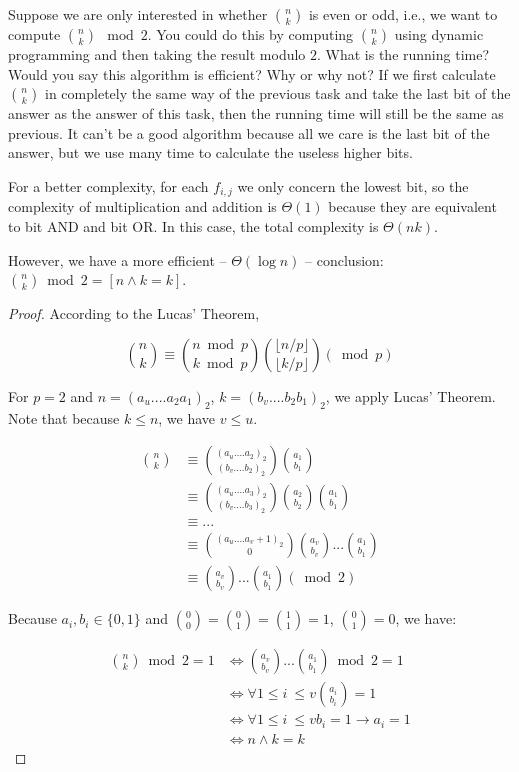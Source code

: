 \documentclass[11pt,a4paper,oneside]{article}
\begin{document}
\begin{problem}{5}
    \statement
    Suppose we are only interested in whether ${n \choose k}$ is even or odd,
  i.e., we want to compute ${n \choose k}  \mod 2$. You could do this by computing 
  ${n \choose k}$ using dynamic programming and then taking
  the result modulo $2$. What is the running time? Would you say this algorithm
  is efficient? Why or why not?
  \solution
If we first calculate ${n \choose k}$ in completely the same way of the previous task and take the last bit of the answer as the answer of this task, then the running time will still be the same as previous. It can't be a good algorithm because all we care is the last bit of the answer, but we use many time to calculate the useless higher bits.

For a better complexity, for each $f_{i, j}$ we only concern the lowest bit, so the complexity of multiplication and addition is $\Theta(1)$ because they are equivalent to bit AND and bit OR. In this case, the total complexity is $\Theta(nk)$.

However, we have a more efficient  -- $\Theta (\log n)$ -- conclusion:  $ {n \choose k} \bmod 2 = [n \wedge k = k]$.
	\begin{proof}
		According to the Lucas' Theorem, 
		
		\[
			{n \choose k}\equiv{{n \bmod p} \choose {k \bmod p}}{{ \lfloor n/p\rfloor} \choose { \lfloor k/p\rfloor}}(\bmod p)
		\]
		
		For $p=2$ and $n=(a_u....a_2a_1)_2$, $k=(b_v....b_2b_1)_2$, we apply Lucas' Theorem. Note that because $k\leq n$, we have $v\leq u$.
		
		\[
			\begin{split}
			{n \choose k} &\equiv {(a_u....a_2)_2 \choose (b_v....b_2)_2}{a_1 \choose b_1}\\
			&\equiv {(a_u....a_3)_2 \choose (b_v....b_3)_2}{a_2 \choose b_2}{a_1 \choose b_1}\\
			&\equiv ...\\
			&\equiv {(a_u....a_v+1)_2 \choose 0}{a_v \choose b_v}...{a_1 \choose b_1}\\
			&\equiv {a_v \choose b_v}...{a_1 \choose b_1}(\bmod 2)
			\end{split}
		\]
		
		Because $a_i,b_i\in \{0,1\}$ and ${0 \choose 0}={0 \choose 1}={1 \choose 1}=1$, ${0 \choose 1}=0$, we have:
		
		\[
			\begin{split}
			{n \choose k} \bmod 2 = 1 &\Leftrightarrow {a_v \choose b_v}...{a_1 \choose b_1}\bmod 2=1 \\
			&\Leftrightarrow \forall 1\leq i\ \leq v {a_i \choose b_i}=1\\
			&\Leftrightarrow \forall 1\leq i\ \leq v b_i=1\rightarrow a_i=1\\
			&\Leftrightarrow n \wedge k = k
			\end{split}
		\]		
    \end{proof}
\end{problem}
\end{document}
